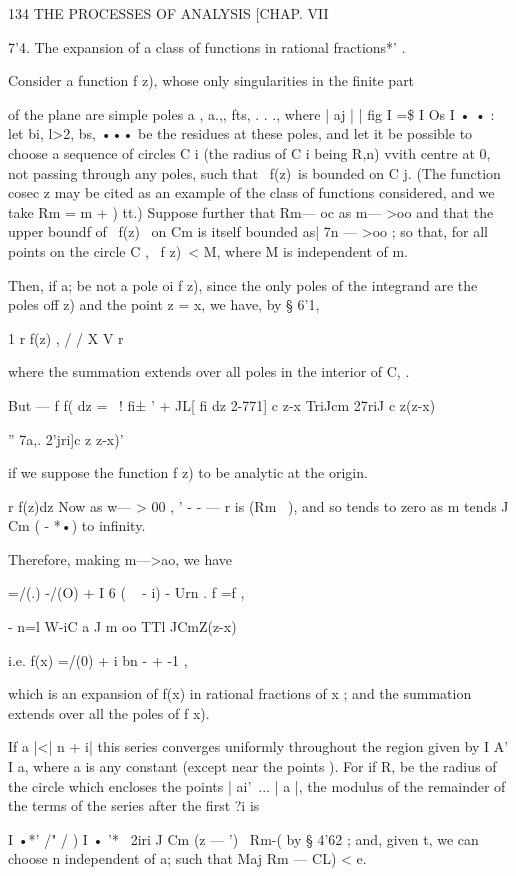 134 THE PROCESSES OF ANALYSIS [CHAP. VII

  7'4. The expansion of a class of functions in rational fractions*' .

  Consider a function f z), whose only singularities in the finite
part

of the plane are simple poles a , a.,, fts, . . ., where | aj | | fig
I =\$ I Os I • • : let bi, l>2, bs, ••• be the residues at these
poles, and let it be possible to choose a sequence of circles C i (the
radius of C i being R,n) vvith centre at 0, not passing through any
poles, such that \ f(z)\ is bounded on C j. (The function cosec z may
be cited as an example of the class of functions considered, and we
take Rm = m + ) tt.) Suppose further that Rm— oc as m— >oo and that
the upper boundf of \ f(z) \ on Cm is itself bounded as| 7n — >oo ; so
that, for all points on the circle C , \ f z)\ < M, where M is
independent of m.

Then, if a; be not a pole oi f z), since the only poles of the
integrand are the poles off z) and the point z = x, we have, by § 6'1,

1 r f(z) , / / X V r

where the summation extends over all poles in the interior of C, .

But — f f( dz = ~! fi± ' + JL[ fi dz 2-771] c z-x TriJcm 27riJ c
z(z-x)

  '' 7a,. 2'jri]c z z-x)'

if we suppose the function f z) to be analytic at the origin.

r f(z)dz Now as w— > 00 , ' - - — r is (Rm~ ), and so tends to zero as
m tends J Cm ( - *•) to infinity.

Therefore, making m—>ao, we have

=/(.) -/(O) + I 6 ( ~ - i) - Urn . f =f ,

- n=l W-iC a J m oo TTl JCmZ(z-x)

i.e. f(x) =/(0) + i bn - + -1 ,

which is an expansion of f(x) in rational fractions of x ; and the
summation extends over all the poles of f x).

If a |<| n + i| this series converges uniformly throughout the region
given by I A' I a, where a is any constant (except near the points ).
For if R, be the radius of the circle which encloses the points |
ai'\, ... | a |, the modulus of the remainder of the terms of the
series after the first ?i is

I •*' /" / ) I • '* \ 2iri J Cm (z — ') \ Rm-( by § 4'62 ; and, given
t, we can choose n independent of a; such that Maj Rm — CL) < e.

